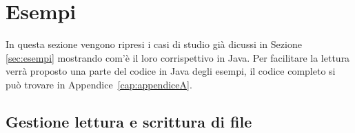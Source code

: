 \section{Esempi}
\label{sec:implementazione_esempi}

In questa sezione vengono ripresi i casi di studio già dicussi in Sezione \ref{sec:esempi} mostrando com'è il loro corrispettivo in Java. 
Per facilitare la lettura verrà proposto una parte del codice in Java degli esempi, il codice completo si può trovare in Appendice~\ref{cap:appendiceA}.


\subsection{Gestione lettura e scrittura di file}
\label{sub:primo_std_java}


